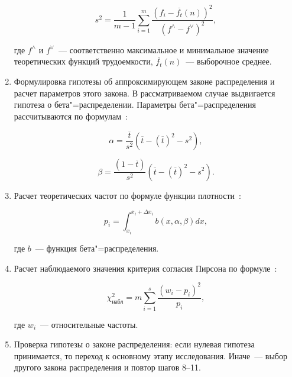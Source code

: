 \documentclass[a4paper, article, 14pt]{extarticle}
\begin{document}
\begin{enumerate}
	\begin{equation}\label{eq:variance}
		s^2 = \frac{1}{m - 1} \sum_{i=1}^{m}{\frac{(f_i - \overline{f_t}(n))^2}{(f^\wedge - f^\vee)^2}},
	\end{equation}

	где $f^\wedge$ и $f^\vee$~--- соответственно максимальное и минимальное значение теоретических функций трудоемкости, $\overline{f_t}(n)$~--- выборочное среднее.
	
	\item Формулировка гипотезы об аппроксимирующем законе распределения и расчет параметров этого закона. В рассматриваемом случае выдвигается гипотеза о бета"=распределении. Параметры бета"=распределения рассчитываются по формулам~\cite{petrushyn_ulyanov_planning}:

	\begin{equation}\label{eq:alpha}
		\alpha = \frac{\overline{t}}{s^2} (\overline{t} - (\overline{t})^2 - s^2),
	\end{equation}

	\begin{equation}\label{eq:beta}
		\beta = \frac{(1 - \overline{t})}{s^2} (\overline{t} - (\overline{t})^2 - s^2).
	\end{equation}

	\item Расчет теоретических частот по формуле функции плотности~\cite{petrushyn_ulyanov_planning}:

	\begin{equation}\label{eq:frequency}
		p_i = \int_{x_i}^{x_i + \Delta x_i}{b(x, \alpha, \beta) dx},
	\end{equation}

	где $b$~--- функция бета"=распределения.

	\item Расчет наблюдаемого значения критерия согласия Пирсона по формуле~\cite{koroluk}:
	
	\begin{equation}\label{eq:pirson_criteria_concrete}
		\chi_{\text{набл}}^2 = m \sum_{i=1}^{s} \frac{(w_i - p_i)^2}{p_i},
	\end{equation}

	где $w_i$~--- относительные частоты.

	\item Проверка гипотезы о законе распределения: если нулевая гипотеза принимается, то переход к основному этапу исследования. Иначе~--- выбор другого закона распределения и повтор шагов 8--11.
\end{enumerate}
\end{document}
